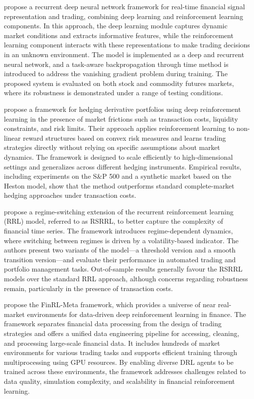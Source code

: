 \documentclass[]{elsarticle}
\begin{document}
\citet{Deng2016} propose a recurrent deep neural network framework for real-time financial signal representation and trading, combining deep learning and reinforcement learning components. In this approach, the deep learning module captures dynamic market conditions and extracts informative features, while the reinforcement learning component interacts with these representations to make trading decisions in an unknown environment. The model is implemented as a deep and recurrent neural network, and a task-aware backpropagation through time method is introduced to address the vanishing gradient problem during training. The proposed system is evaluated on both stock and commodity futures markets, where its robustness is demonstrated under a range of testing conditions.

\citet{Buehler_2019} propose a framework for hedging derivative portfolios using deep reinforcement learning in the presence of market frictions such as transaction costs, liquidity constraints, and risk limits. Their approach applies reinforcement learning to non-linear reward structures based on convex risk measures and learns trading strategies directly without relying on specific assumptions about market dynamics. The framework is designed to scale efficiently to high-dimensional settings and generalizes across different hedging instruments. Empirical results, including experiments on the S\&P 500 and a synthetic market based on the Heston model, show that the method outperforms standard complete-market hedging approaches under transaction costs.

\citet{maringer2012regime} propose a regime-switching extension of the recurrent reinforcement learning (RRL) model, referred to as RSRRL, to better capture the complexity of financial time series. The framework introduces regime-dependent dynamics, where switching between regimes is driven by a volatility-based indicator. The authors present two variants of the model—a threshold version and a smooth transition version—and evaluate their performance in automated trading and portfolio management tasks. Out-of-sample results generally favour the RSRRL models over the standard RRL approach, although concerns regarding robustness remain, particularly in the presence of transaction costs.

\citet{Liu_2025} propose the FinRL-Meta framework, which provides a universe of near real-market environments for data-driven deep reinforcement learning in finance. The framework separates financial data processing from the design of trading strategies and offers a unified data engineering pipeline for accessing, cleaning, and processing large-scale financial data. It includes hundreds of market environments for various trading tasks and supports efficient training through multiprocessing using GPU resources. By enabling diverse DRL agents to be trained across these environments, the framework addresses challenges related to data quality, simulation complexity, and scalability in financial reinforcement learning.
\end{document}

